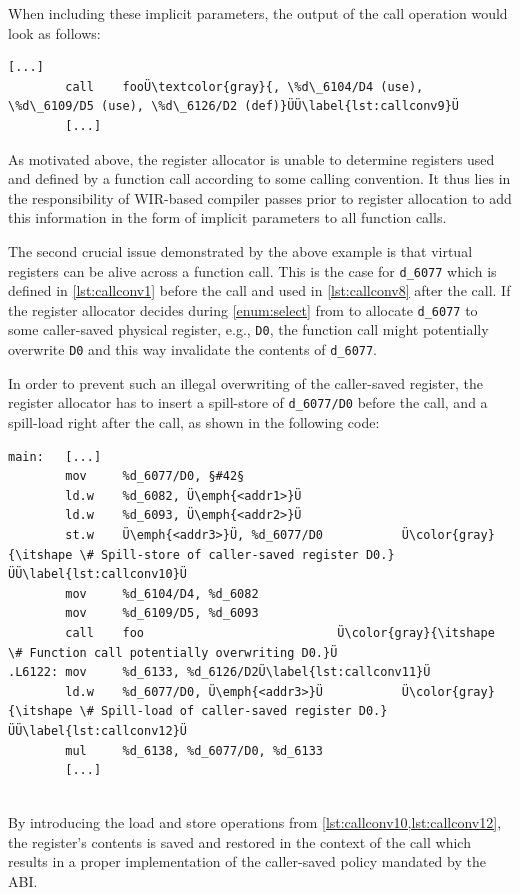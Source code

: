 When including these implicit parameters, the output of the call operation would look as follows: \\
\begin{lstlisting}[style=code,float=!h,aboveskip=-0.8 \baselineskip,belowskip=-0.8 \baselineskip]
        [...]
        call    fooÜ\textcolor{gray}{, \%d\_6104/D4 (use), \%d\_6109/D5 (use), \%d\_6126/D2 (def)}ÜÜ\label{lst:callconv9}Ü
        [...]
\end{lstlisting}

\begin{wirNote}
  As motivated above, the register allocator is unable to determine registers used and defined by a function call according to some calling convention.
  It thus lies in the responsibility of \gls{WIR}-based compiler passes prior to register allocation to add this information in the form of implicit parameters to all function calls.
\end{wirNote}

The second crucial issue demonstrated by the above example is that virtual registers can be alive across a function call.
This is the case for \texttt{d\_6077} which is defined in \cref{lst:callconv1} before the call and used in \cref{lst:callconv8} after the call.
If the register allocator decides during \cref{enum:select} from  to allocate \texttt{d\_6077} to some caller-saved physical register, e.g., \texttt{D0}, the function call might potentially overwrite \texttt{D0} and this way invalidate the contents of \texttt{d\_6077}.

In order to prevent such an illegal overwriting of the caller-saved register, the register allocator has to insert a spill-store of \texttt{d\_6077/D0} before the call, and a spill-load right after the call, as shown in the following code: \\
\begin{lstlisting}[style=code,float=!h,aboveskip=-0.8 \baselineskip,belowskip=-0.8 \baselineskip]
main:   [...]
        mov     %d_6077/D0, §#42§
        ld.w    %d_6082, Ü\emph{<addr1>}Ü
        ld.w    %d_6093, Ü\emph{<addr2>}Ü
        st.w    Ü\emph{<addr3>}Ü, %d_6077/D0           Ü\color{gray}{\itshape \# Spill-store of caller-saved register D0.}ÜÜ\label{lst:callconv10}Ü
        mov     %d_6104/D4, %d_6082
        mov     %d_6109/D5, %d_6093
        call    foo                           Ü\color{gray}{\itshape \# Function call potentially overwriting D0.}Ü
.L6122: mov     %d_6133, %d_6126/D2Ü\label{lst:callconv11}Ü
        ld.w    %d_6077/D0, Ü\emph{<addr3>}Ü           Ü\color{gray}{\itshape \# Spill-load of caller-saved register D0.}ÜÜ\label{lst:callconv12}Ü
        mul     %d_6138, %d_6077/D0, %d_6133
        [...]
\end{lstlisting}
\\
By introducing the load and store operations from \cref{lst:callconv10,lst:callconv12}, the register's contents is saved and restored in the context of the call which results in a proper implementation of the caller-saved policy mandated by the \gls{ABI}.

